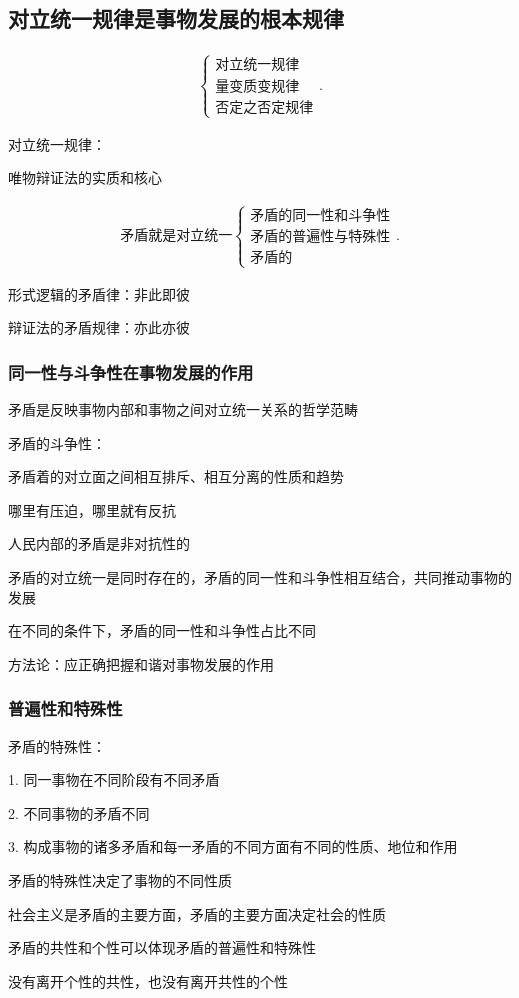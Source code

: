 \subsection{对立统一规律是事物发展的根本规律}%
\label{sub:对立统一规律是事物发展的根本规律}
\begin{align*}
    \begin{cases}
        \text{对立统一规律}\\
        \text{量变质变规律}\\
        \text{否定之否定规律}
    \end{cases}
.\end{align*}
\begin{notation}
    对立统一规律：

    唯物辩证法的实质和核心
\end{notation}
\begin{align*}
    \text{矛盾就是对立统一}
    \begin{cases}
        \text{矛盾的同一性和斗争性}\\
        \text{矛盾的普遍性与特殊性}\\
        \text{矛盾的}
    \end{cases}
.\end{align*}
\begin{notation}
    形式逻辑的矛盾律：非此即彼

    辩证法的矛盾规律：亦此亦彼
\end{notation}
\subsubsection{同一性与斗争性在事物发展的作用}%
\label{subsub:同一性与斗争性在事物发展的作用}
矛盾是反映事物内部和事物之间对立统一关系的哲学范畴
\begin{notation}
    矛盾的斗争性：

    矛盾着的对立面之间相互排斥、相互分离的性质和趋势

    哪里有压迫，哪里就有反抗
\end{notation}
\begin{notation}
    人民内部的矛盾是非对抗性的
\end{notation}
\begin{notation}
    矛盾的对立统一是同时存在的，矛盾的同一性和斗争性相互结合，共同推动事物的发展

    在不同的条件下，矛盾的同一性和斗争性占比不同

    方法论：应正确把握和谐对事物发展的作用
\end{notation}
\subsubsection{普遍性和特殊性}%
\label{subsub:普遍性和特殊性}
矛盾的特殊性：

1. 同一事物在不同阶段有不同矛盾

2. 不同事物的矛盾不同

3. 构成事物的诸多矛盾和每一矛盾的不同方面有不同的性质、地位和作用
\begin{notation}
    矛盾的特殊性决定了事物的不同性质
\end{notation}
社会主义是矛盾的主要方面，矛盾的主要方面决定社会的性质

矛盾的共性和个性可以体现矛盾的普遍性和特殊性
\begin{notation}
    没有离开个性的共性，也没有离开共性的个性
\end{notation}
